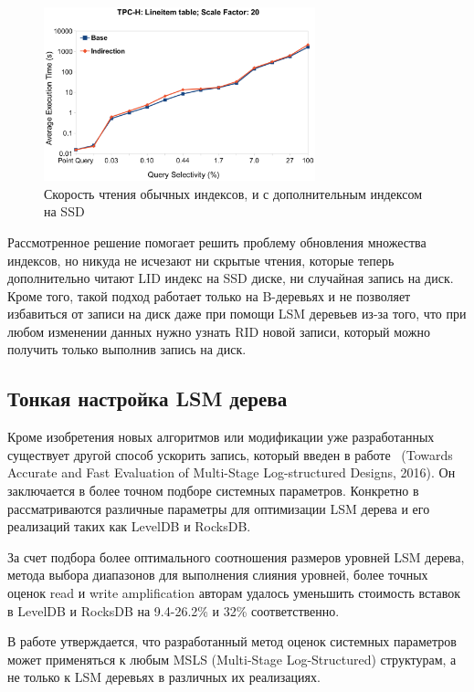 \documentclass[a4paper,hidelinks,12pt]{article}
\begin{document}
\begin{figure}[h]
\centering
\includegraphics[width=0.7\textwidth]{ssd_friendly_query}
\caption{Скорость чтения обычных индексов, и с дополнительным индексом на SSD}
\label{fig:ssd_friendly_query}
\end{figure}

Рассмотренное решение помогает решить проблему обновления множества индексов, но
никуда не исчезают ни скрытые чтения, которые теперь дополнительно читают LID
индекс на SSD диске, ни случайная запись на диск. Кроме того, такой подход
работает только на B-деревьях и не позволяет избавиться от записи на диск даже
при помощи LSM деревьев из-за того, что при любом изменении данных нужно узнать
RID новой записи, который можно получить только выполнив запись на диск.

\subsection{Тонкая настройка LSM дерева}
Кроме изобретения новых алгоритмов или модификации уже разработанных существует
другой способ ускорить запись, который введен в работе~\cite{evaluation_lsm}
(Towards Accurate and Fast Evaluation of Multi-Stage Log-structured Designs,
2016). Он заключается в более точном подборе системных параметров. Конкретно в
~\cite{evaluation_lsm} рассматриваются различные параметры для оптимизации
LSM дерева и его реализаций таких как LevelDB и RocksDB.

За счет подбора более оптимального соотношения размеров уровней LSM дерева,
метода выбора диапазонов для выполнения слияния уровней, более точных оценок
read и write amplification авторам удалось уменьшить стоимость вставок в LevelDB
и RocksDB на 9.4-26.2\% и 32\% соответственно.

В работе утверждается, что разработанный метод оценок системных параметров может
применяться к любым MSLS (Multi-Stage Log-Structured) структурам, а не только к
LSM деревьях в различных их реализациях.
\end{document}
